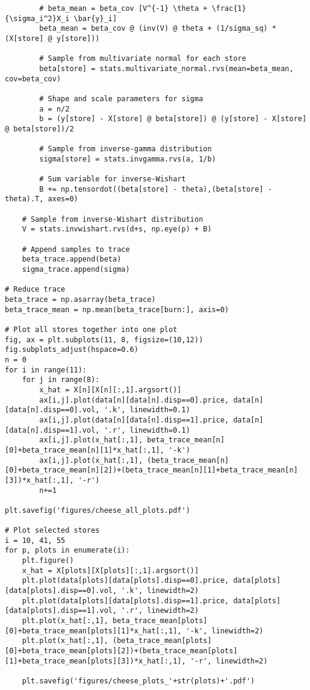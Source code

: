 \documentclass[12pt]{article}
\begin{document}
\begin{lstlisting}
        # beta_mean = beta_cov [V^{-1} \theta + \frac{1}{\sigma_i^2}X_i \bar{y}_i]
        beta_mean = beta_cov @ (inv(V) @ theta + (1/sigma_sq) * (X[store] @ y[store]))

        # Sample from multivariate normal for each store
        beta[store] = stats.multivariate_normal.rvs(mean=beta_mean, cov=beta_cov)

        # Shape and scale parameters for sigma
        a = n/2
        b = (y[store] - X[store] @ beta[store]) @ (y[store] - X[store] @ beta[store])/2

        # Sample from inverse-gamma distribution
        sigma[store] = stats.invgamma.rvs(a, 1/b)
    
        # Sum variable for inverse-Wishart
        B += np.tensordot((beta[store] - theta),(beta[store] - theta).T, axes=0)

    # Sample from inverse-Wishart distribution
    V = stats.invwishart.rvs(d+s, np.eye(p) + B)

    # Append samples to trace
    beta_trace.append(beta)
    sigma_trace.append(sigma)

# Reduce trace
beta_trace = np.asarray(beta_trace)
beta_trace_mean = np.mean(beta_trace[burn:], axis=0)

# Plot all stores together into one plot
fig, ax = plt.subplots(11, 8, figsize=(10,12))
fig.subplots_adjust(hspace=0.6)
n = 0
for i in range(11):
    for j in range(8):
        x_hat = X[n][X[n][:,1].argsort()]
        ax[i,j].plot(data[n][data[n].disp==0].price, data[n][data[n].disp==0].vol, '.k', linewidth=0.1)
        ax[i,j].plot(data[n][data[n].disp==1].price, data[n][data[n].disp==1].vol, '.r', linewidth=0.1)
        ax[i,j].plot(x_hat[:,1], beta_trace_mean[n][0]+beta_trace_mean[n][1]*x_hat[:,1], '-k')
        ax[i,j].plot(x_hat[:,1], (beta_trace_mean[n][0]+beta_trace_mean[n][2])+(beta_trace_mean[n][1]+beta_trace_mean[n][3])*x_hat[:,1], '-r')
        n+=1

plt.savefig('figures/cheese_all_plots.pdf')

# Plot selected stores
i = 10, 41, 55
for p, plots in enumerate(i):
    plt.figure()
    x_hat = X[plots][X[plots][:,1].argsort()]
    plt.plot(data[plots][data[plots].disp==0].price, data[plots][data[plots].disp==0].vol, '.k', linewidth=2)
    plt.plot(data[plots][data[plots].disp==1].price, data[plots][data[plots].disp==1].vol, '.r', linewidth=2)
    plt.plot(x_hat[:,1], beta_trace_mean[plots][0]+beta_trace_mean[plots][1]*x_hat[:,1], '-k', linewidth=2)
    plt.plot(x_hat[:,1], (beta_trace_mean[plots][0]+beta_trace_mean[plots][2])+(beta_trace_mean[plots][1]+beta_trace_mean[plots][3])*x_hat[:,1], '-r', linewidth=2)

    plt.savefig('figures/cheese_plots_'+str(plots)+'.pdf')
    \end{lstlisting}
\end{document}

